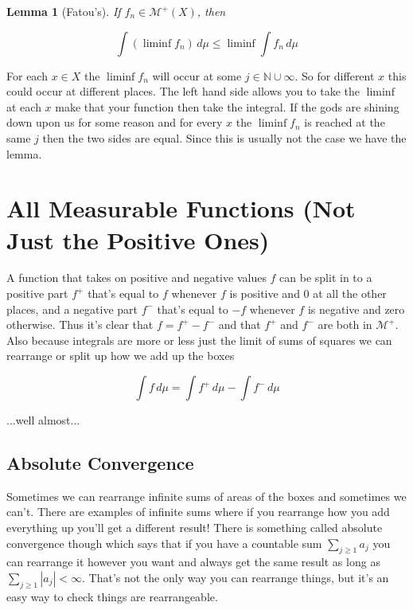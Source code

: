 \documentclass[oneside]{book}
\newtheorem{lemma}[theorem]{Lemma}
\newenvironment{proof}[1][Proof]{\begin{trivlist}
\item[\hskip \labelsep {\bfseries #1}]}{\end{trivlist}}
\begin{document}
\begin{lemma}[Fatou's]
If $f_n \in \mathcal{M}^+(X)$, then

\begin{equation}
\int (\liminf f_n)\, d\mu \le \liminf \int f_n\, d\mu
\end{equation}
\end{lemma}

\begin{proof}
For each $x \in X$ the $\liminf f_n$ will occur at some $j \in \mathbb{N} \cup \infty$. So for different $x$ this could occur at different places. The left hand side allows you to take the $\liminf$ at each $x$ make that your function then take the integral. If the gods are shining down upon us for some reason and for every $x$ the $\liminf f_n$ is reached at the same $j$ then the two sides are equal. Since this is usually not the case we have the lemma. 
\end{proof}

\section{All Measurable Functions (Not Just the Positive Ones)}
A function that takes on positive and negative values $f$ can be split in to a positive part $f^+$ that's equal to $f$ whenever $f$ is positive and 0 at all the other places, and a negative part $f^-$ that's equal to $-f$ whenever $f$ is negative and zero otherwise. Thus it's clear that $f=f^+-f^-$ and that $f^+$ and $f^-$ are both in $\mathcal{M}^+$. Also because integrals are more or less just the limit of sums of squares we can rearrange or split up how we add up the boxes

\begin{equation}
\int f\, d\mu = \int f^+\, d\mu - \int f^-\, d\mu
\end{equation}

...well almost...

\subsection{Absolute Convergence}
Sometimes we can rearrange infinite sums of areas of the boxes and sometimes we can't. There are examples of infinite sums where if you rearrange how you add everything up you'll get a different result! There is something called absolute convergence though which says that if you have a countable sum $\sum_{j \ge 1} a_j$ you can rearrange it however you want and always get the same result as long as $\sum_{j \ge 1} |a_j| < \infty$. That's not the only way you can rearrange things, but it's an easy way to check things are rearrangeable. 
\end{document}
